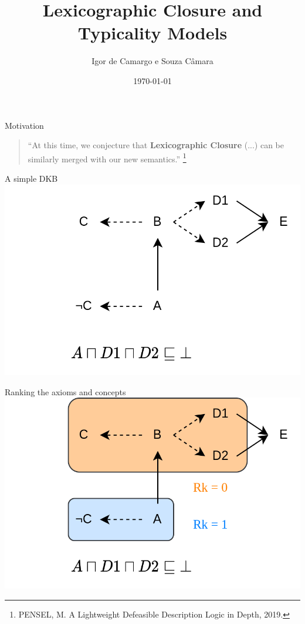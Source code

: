 \documentclass[10pt]{beamer}
\title{Lexicographic Closure and Typicality Models}
\date{\today}
\author{Igor de Camargo e Souza Câmara}
\institute{University of São Paulo}
\begin{document}
\begin{frame}[plain]
  \titlepage
\end{frame}

\begin{frame}[fragile]{Motivation}
  \begin{quote}
    {\large
    ``At this time, we conjecture that \textbf{Lexicographic Closure} (...) can be similarly merged with our new semantics.'' \footnote{PENSEL, M. A Lightweight Defeasible Description Logic in Depth, 2019.}}
  \end{quote}
\end{frame}

\begin{frame}[fragile]{A simple DKB}
  \includegraphics[scale=.35]{img/KB1.png}
\end{frame}

\begin{frame}[fragile]{Ranking the axioms and concepts}
  \includegraphics[scale=.35]{img/rank.png}
\end{frame}
\end{document}

